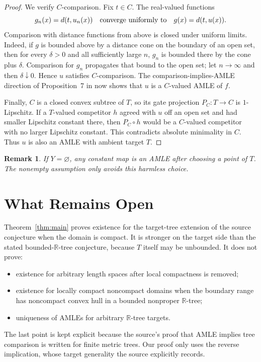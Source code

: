 \documentclass[11pt]{article}
\newtheorem{remark}{Remark}
\newcommand{\R}{\mathbb R}
\begin{document}
\begin{proof}
We verify $C$-comparison.  Fix $t\in C$.  The real-valued functions
\[
 g_n(x)=d(t,u_n(x))
 \quad\hbox{converge uniformly to}\quad
 g(x)=d(t,u(x)).
\]
Comparison with distance functions from above is closed under uniform
limits.  Indeed, if $g$ is bounded above by a distance cone on the boundary
of an open set, then for every $\delta>0$ and all sufficiently large $n$,
$g_n$ is bounded there by the cone plus $\delta$.  Comparison for $g_n$
propagates that bound to the open set; let $n\to\infty$ and then
$\delta\downarrow0$.  Hence $u$ satisfies $C$-comparison.  The
comparison-implies-AMLE direction of Proposition~7 in \cite{NS} now shows
that $u$ is a $C$-valued AMLE of $f$.

Finally, $C$ is a closed convex subtree of $T$, so its gate projection
$P_C:T\to C$ is $1$-Lipschitz.  If a $T$-valued competitor $h$ agreed with
$u$ off an open set and had smaller Lipschitz constant there, then
$P_C\circ h$ would be a $C$-valued competitor with no larger Lipschitz
constant.  This contradicts absolute minimality in $C$.  Thus $u$ is also
an AMLE with ambient target $T$.
\end{proof}

\begin{remark}
If $Y=\varnothing$, any constant map is an AMLE after choosing a point of
$T$.  The nonempty assumption only avoids this harmless choice.
\end{remark}

\section*{What Remains Open}

Theorem~\ref{thm:main} proves existence for the target-tree extension of the
source conjecture when the domain is compact.  It is stronger on the target
side than the stated bounded-$\R$-tree conjecture, because $T$ itself may be
unbounded.  It does not prove:
\begin{itemize}
\item existence for arbitrary length spaces after local compactness is
removed;
\item existence for locally compact noncompact domains when the boundary
range has noncompact convex hull in a bounded nonproper $\R$-tree;
\item uniqueness of AMLEs for arbitrary $\R$-tree targets.
\end{itemize}
The last point is kept explicit because the source's proof that AMLE implies
tree comparison is written for finite metric trees.  Our proof only uses the
reverse implication, whose target generality the source explicitly records.
\end{document}
